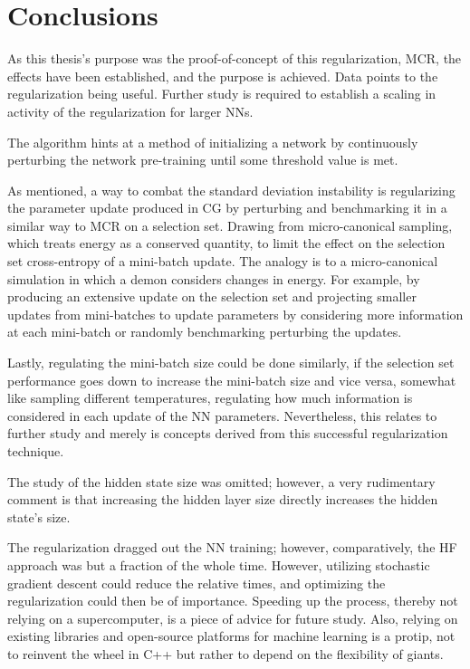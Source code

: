 \chapter{Conclusions}

As this thesis's purpose was the proof-of-concept of this regularization, MCR, the effects have been established, and the purpose is achieved. Data points to the regularization being useful. Further study is required to establish a scaling in activity of the regularization for larger NNs.

The algorithm hints at a method of initializing a network by continuously perturbing the network pre-training until some threshold value is met. 

As mentioned, a way to combat the standard deviation instability is regularizing the parameter update produced in CG by perturbing and benchmarking it in a similar way to MCR on a selection set. Drawing from micro-canonical sampling, which treats energy as a conserved quantity, to limit the effect on the selection set cross-entropy of a mini-batch update. The analogy is to a micro-canonical simulation in which a demon considers changes in energy. For example, by producing an extensive update on the selection set and projecting smaller updates from mini-batches to update parameters by considering more information at each mini-batch or randomly benchmarking perturbing the updates.

Lastly, regulating the mini-batch size could be done similarly, if the selection set performance goes down to increase the mini-batch size and vice versa, somewhat like sampling different temperatures, regulating how much information is considered in each update of the NN parameters. Nevertheless, this relates to further study and merely is concepts derived from this successful regularization technique.

The study of the hidden state size was omitted; however, a very rudimentary comment is that increasing the hidden layer size directly increases the hidden state's size.

The regularization dragged out the NN training; however, comparatively, the HF approach was but a fraction of the whole time. However, utilizing stochastic gradient descent could reduce the relative times, and optimizing the regularization could then be of importance. Speeding up the process, thereby not relying on a supercomputer, is a piece of advice for future study. Also, relying on existing libraries and open-source platforms for machine learning is a protip, not to reinvent the wheel in C++ but rather to depend on the flexibility of giants.

